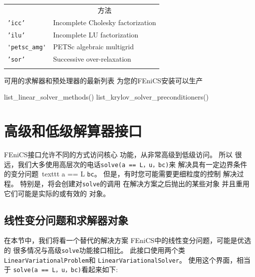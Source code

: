 {\small

\vspace{4mm}

\begin{tabular}{ll}
\hline\noalign{\smallskip}
\multicolumn{1}{c}{ 名称 } & \multicolumn{1}{c}{ 方法 } \\
\noalign{\smallskip}\hline\noalign{\smallskip}
\texttt{'icc'}       & Incomplete Cholesky factorization \\
\texttt{'ilu'}       & Incomplete LU factorization       \\
\verb!'petsc_amg'! & PETSc algebraic multigrid         \\
\texttt{'sor'}       & Successive over-relaxation        \\
\noalign{\smallskip}\hline\noalign{\smallskip}
\end{tabular}

\vspace{4mm}

}

\noindent
可用的求解器和预处理器的最新列表
为您的FEniCS安装可以生产

\begin{python}
list_linear_solver_methods()
list_krylov_solver_preconditioners()
\end{python}

\section{高级和低级解算器接口}

FEniCS接口允许不同的方式访问核心
功能，从非常高级到低级访问。 所以
很远，我们大多使用高层次的电话\texttt{solve(a == L，u，bc)}来
解决具有一定边界条件的变分问题\ texttt {a == L}
\texttt{bc}。 但是，有时您可能需要更细粒度的控制
解决过程。 特别是，将会创建对\texttt{solve}的调用
在解决方案之后抛出的某些对象
并且重用它们可能是实际的或有效的
对象。

\subsection{线性变分问题和求解器对象}
\label{ch:poisson0:solver:problem}

在本节中，我们将看一个替代的解决方案
FEniCS中的线性变分问题，可能是优选的
很多情况与高级\texttt{solve}功能接口相比。
此接口使用两个类\texttt{LinearVariationalProblem}和
\texttt{LinearVariationalSolver}。 使用这个界面，相当于
\texttt{solve(a == L，u，bc)}看起来如下:

